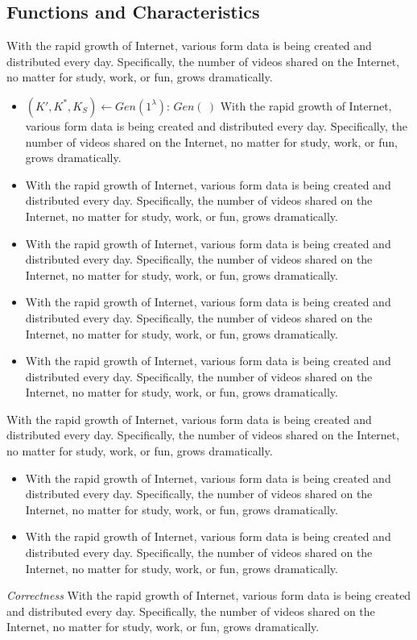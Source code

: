 \documentclass[a4paper,12pt,UTF8]{ctexart}
\begin{document}
\begin{spacing}{1.1}
\subsection{Functions and Characteristics}
With the rapid growth of Internet, various form data is being created and distributed every day. Specifically, the number of videos shared on the Internet, no matter for study, work, or fun, grows dramatically.  \vspace{1.8mm}
\begin{itemize}
	\setlength{\itemsep}{1.50mm} %
	\setlength{\parskip}{0mm} %
	\setlength{\parsep}{0pt} %
	\item $(K',K^*,K_S)\leftarrow Gen(1^{\lambda})$: $Gen(\ )$ With the rapid growth of Internet, various form data is being created and distributed every day. Specifically, the number of videos shared on the Internet, no matter for study, work, or fun, grows dramatically. 
	\item With the rapid growth of Internet, various form data is being created and distributed every day. Specifically, the number of videos shared on the Internet, no matter for study, work, or fun, grows dramatically. 
	\item With the rapid growth of Internet, various form data is being created and distributed every day. Specifically, the number of videos shared on the Internet, no matter for study, work, or fun, grows dramatically. 
	\item With the rapid growth of Internet, various form data is being created and distributed every day. Specifically, the number of videos shared on the Internet, no matter for study, work, or fun, grows dramatically.     
	\item With the rapid growth of Internet, various form data is being created and distributed every day. Specifically, the number of videos shared on the Internet, no matter for study, work, or fun, grows dramatically. 
\end{itemize}
\indent\indent With the rapid growth of Internet, various form data is being created and distributed every day. Specifically, the number of videos shared on the Internet, no matter for study, work, or fun, grows dramatically. 
\begin{itemize}
	\setlength{\itemsep}{1.50mm} %
	\setlength{\parskip}{0mm} %
	\setlength{\parsep}{0pt} %
	\item With the rapid growth of Internet, various form data is being created and distributed every day. Specifically, the number of videos shared on the Internet, no matter for study, work, or fun, grows dramatically. 
	\item With the rapid growth of Internet, various form data is being created and distributed every day. Specifically, the number of videos shared on the Internet, no matter for study, work, or fun, grows dramatically. 
\end{itemize} 
\indent\indent\emph{Correctness} With the rapid growth of Internet, various form data is being created and distributed every day. Specifically, the number of videos shared on the Internet, no matter for study, work, or fun, grows dramatically. 
\clearpage

\end{spacing}
\end{document}
